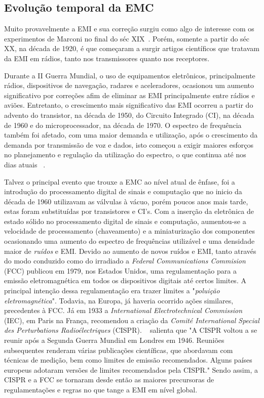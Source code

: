 \subsection{Evolução temporal da EMC}
Muito provavelmente a EMI e sua correção surgiu como algo de interesse com os experimentos de Marconi no final do séc XIX~\cite[p.~10]{paul2006}. Porém, somente a partir do séc XX, na década de 1920, é que começaram a surgir artigos científicos que tratavam da EMI em rádios, tanto nos transmissores quanto nos receptores.

Durante a II Guerra Mundial, o uso de equipamentos eletrônicos, principalmente rádios, dispositivos de navegação, radares e aceleradores, ocasionou um aumento significativo por correções afim de eliminar as EMI principalmente entre rádios e aviões. Entretanto, o crescimento mais significativo das EMI ocorreu a partir do advento do transistor, na década de 1950, do Circuito Integrado (CI), na década de 1960 e do microprocessador, na década de 1970. O espectro de frequência também foi afetado, com uma maior demanda e utilização, após o crescimento da demanda por transmissão de voz e dados, isto começou a exigir maiores esforços no planejamento e regulação da utilização do espectro, o que continua até nos dias atuais ~\cite[p.~10]{paul2006}.

Talvez o principal evento que trouxe a EMC ao nível atual de ênfase, foi a introdução do processamento digital de sinais e computação que no inicio da década de 1960 utilizavam as válvulas à vácuo, porém poucos anos mais tarde, estas foram substituídas por transistores e CI's. Com a inserção da eletrônica de estado sólido no processamento digital de sinais e computação, aumentou-se a velocidade de processamento (chaveamento) e a miniaturização dos componentes ocasionando uma aumento do espectro de frequências utilizável e uma densidade maior de \textit{ruídos} e EMI. Devido ao aumento de novos ruídos e EMI, tanto através do modo conduzido como do irradiado a \textit{Federal Communications Commision} (FCC) publicou em 1979, nos Estados Unidos, uma regulamentação para a emissão eletromagnética em todos os dispositivos digitais até certos limites. A principal intenção dessa regulamentação era trazer limites a "\textit{poluição eletromagnética}". Todavia, na Europa, já haveria ocorrido ações similares, precedentes à FCC. Já em 1933 a \textit{International Electrotechnical Commission} (IEC), em Paris na França, recomendou a criação da \textit{Comité International Special des Perturbations Radioélectriques} (CISPR). ~ salienta que "A CISPR voltou a se reunir após a Segunda Guerra Mundial em Londres em 1946. Reuniões subsequentes renderam várias publicações científicas, que abordavam com técnicas de medição, bem como limites de emissão recomendados. Alguns países europeus adotaram versões de limites recomendados pela CISPR." Sendo assim, a CISPR e a FCC se tornaram desde então as maiores precursoras de regulamentações e regras no que tange a EMI em nível global.

